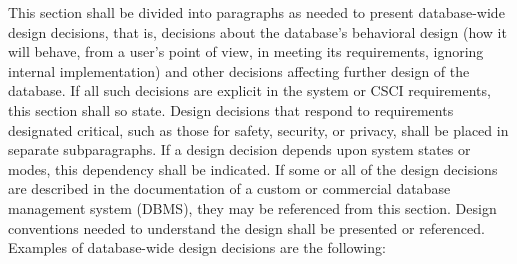\documentclass{fidata-report-template}
\begin{document}
This section shall be divided into paragraphs as needed to present
database-wide design decisions, that is, decisions about the database's
behavioral design (how it will behave, from a user's point of view, in
meeting its requirements, ignoring internal implementation) and other
decisions affecting further design of the database. If all such
decisions are explicit in the system or CSCI requirements, this section
shall so state. Design decisions that respond to requirements designated
critical, such as those for safety, security, or privacy, shall be
placed in separate subparagraphs. If a design decision depends upon
system states or modes, this dependency shall be indicated. If some or
all of the design decisions are described in the documentation of a
custom or commercial database management system (DBMS), they may be
referenced from this section. Design conventions needed to understand
the design shall be presented or referenced. Examples of database-wide
design decisions are the following:
\end{document}
